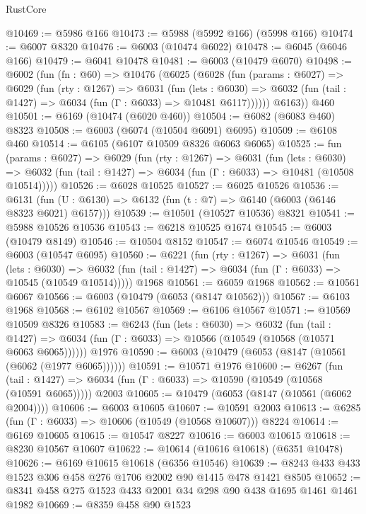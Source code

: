 \begin{lexlean}{RustCore}
\begin{coremodule}
@10469 := @5986 @166
@10473 := @5988 (@5992 @166) (@5998 @166)
@10474 := @6007 @8320
@10476 := @6003 (@10474 @6022)
@10478 := @6045 (@6046 @166)
@10479 := @6041 @10478
@10481 := @6003 (@10479 @6070)
@10498 := @6002
    (fun (fn : @60) =>
    @10476
      (@6025
        (@6028
          (fun (params : @6027) =>
          @6029
            (fun (rty : @1267) =>
            @6031
              (fun (lets : @6030) =>
              @6032 (fun (tail : @1427) => @6034 (fun (Γ : @6033) => @10481 @6117))))))
        @6163))
    @460
@10501 := @6169 (@10474 (@6020 @460))
@10504 := @6082 (@6083 @460) @8323
@10508 := @6003 (@6074 (@10504 @6091) @6095)
@10509 := @6108 @460
@10514 := @6105 (@6107 @10509 @8326 @6063 @6065)
@10525 := fun (params : @6027) =>
  @6029
    (fun (rty : @1267) =>
    @6031
      (fun (lets : @6030) =>
      @6032 (fun (tail : @1427) => @6034 (fun (Γ : @6033) => @10481 (@10508 @10514)))))
@10526 := @6028 @10525
@10527 := @6025 @10526
@10536 := @6131 (fun (U : @6130) => @6132 (fun (t : @7) => @6140 (@6003 (@6146 @8323 @6021) @6157)))
@10539 := @10501 (@10527 @10536) @8321
@10541 := @5988 @10526 @10536
@10543 := @6218 @10525 @1674
@10545 := @6003 (@10479 @8149)
@10546 := @10504 @8152
@10547 := @6074 @10546
@10549 := @6003 (@10547 @6095)
@10560 := @6221
    (fun (rty : @1267) =>
    @6031
      (fun (lets : @6030) =>
      @6032 (fun (tail : @1427) => @6034 (fun (Γ : @6033) => @10545 (@10549 @10514)))))
    @1968
@10561 := @6059 @1968
@10562 := @10561 @6067
@10566 := @6003 (@10479 (@6053 (@8147 @10562)))
@10567 := @6103 @1968
@10568 := @6102 @10567
@10569 := @6106 @10567
@10571 := @10569 @10509 @8326
@10583 := @6243
    (fun (lets : @6030) =>
    @6032
      (fun (tail : @1427) =>
      @6034 (fun (Γ : @6033) => @10566 (@10549 (@10568 (@10571 @6063 @6065))))))
    @1976
@10590 := @6003 (@10479 (@6053 (@8147 (@10561 (@6062 (@1977 @6065))))))
@10591 := @10571 @1976
@10600 := @6267
    (fun (tail : @1427) => @6034 (fun (Γ : @6033) => @10590 (@10549 (@10568 (@10591 @6065)))))
    @2003
@10605 := @10479 (@6053 (@8147 (@10561 (@6062 @2004))))
@10606 := @6003 @10605
@10607 := @10591 @2003
@10613 := @6285 (fun (Γ : @6033) => @10606 (@10549 (@10568 @10607))) @8224
@10614 := @6169 @10605
@10615 := @10547 @8227
@10616 := @6003 @10615
@10618 := @8230 @10567 @10607
@10622 := @10614 (@10616 @10618) (@6351 @10478)
@10626 := @6169 @10615 @10618 (@6356 @10546)
@10639 := @8243 @433 @433 @1523 @306 @458 @276 @1706 @2002 @90 @1415 @478 @1421 @8505
@10652 := @8341 @458 @275 @1523 @433 @2001 @34 @298 @90 @438 @1695 @1461 @1461 @1982
@10669 := @8359
    @458
    @90
    @1523

\end{coremodule}
\end{lexlean}

